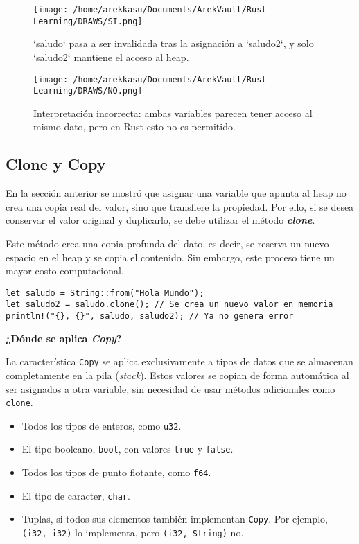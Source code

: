 \documentclass[12pt]{article}
\begin{document}
\begin{figure}[H]
	\centering
	\texttt{[image: /home/arekkasu/Documents/ArekVault/Rust Learning/DRAWS/SI.png]}
	\caption{`saludo` pasa a ser invalidada tras la asignación a `saludo2`, y solo `saludo2` mantiene el acceso al heap.}
\end{figure}

\begin{figure}[H]
	\centering
	\texttt{[image: /home/arekkasu/Documents/ArekVault/Rust Learning/DRAWS/NO.png]}
	\caption{Interpretación incorrecta: ambas variables parecen tener acceso al mismo dato, pero en Rust esto no es permitido.}
\end{figure}

\subsection{Clone y Copy}

En la sección anterior se mostró que asignar una variable que apunta al heap no crea una copia real del valor, sino que transfiere la propiedad. Por ello, si se desea conservar el valor original y duplicarlo, se debe utilizar el método \textbf{\textit{clone}}.

Este método crea una copia profunda del dato, es decir, se reserva un nuevo espacio en el heap y se copia el contenido. Sin embargo, este proceso tiene un mayor costo computacional.

\begin{lstlisting}[style=ruststyle]
let saludo = String::from("Hola Mundo");
let saludo2 = saludo.clone(); // Se crea un nuevo valor en memoria
println!("{}, {}", saludo, saludo2); // Ya no genera error
\end{lstlisting}

\textbf{¿Dónde se aplica \textit{Copy}?}

La característica \texttt{Copy} se aplica exclusivamente a tipos de datos que se almacenan completamente en la pila (\textit{stack}). Estos valores se copian de forma automática al ser asignados a otra variable, sin necesidad de usar métodos adicionales como \texttt{clone}.

\begin{itemize}
	\item Todos los tipos de enteros, como \texttt{u32}.
	\item El tipo booleano, \texttt{bool}, con valores \texttt{true} y \texttt{false}.
	\item Todos los tipos de punto flotante, como \texttt{f64}.
	\item El tipo de caracter, \texttt{char}.
	\item Tuplas, si todos sus elementos también implementan \texttt{Copy}. Por ejemplo, \texttt{(i32, i32)} lo implementa, pero \texttt{(i32, String)} no.
\end{itemize}
\end{document}
